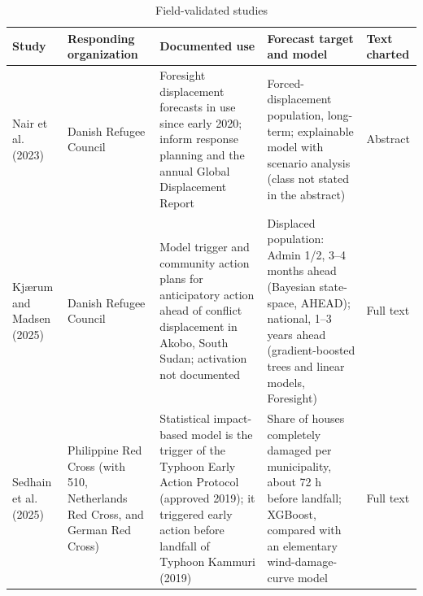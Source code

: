 \begin{table}[htbp!]
\centering
\scriptsize
\caption{Field-validated studies}
\label{tab:deployment_cases}
\begin{tabular}{@{}L{2.1cm}L{2.4cm}L{4.0cm}L{4.0cm}L{1.5cm}@{}}
\toprule
\textbf{Study} & \textbf{Responding organization} & \textbf{Documented use} & \textbf{Forecast target and model} & \textbf{Text charted} \\
\midrule
Nair et al. (2023) \cite{Nair2023ExplainableHumanitarianNeeds} & Danish Refugee Council & Foresight displacement forecasts in use since early 2020; inform response planning and the annual Global Displacement Report & Forced-displacement population, long-term; explainable model with scenario analysis (class not stated in the abstract) & Abstract \\[3pt]
Kj\ae{}rum and Madsen (2025) \cite{Kjaerum2025DisplacementAnticipatory} & Danish Refugee Council & Model trigger and community action plans for anticipatory action ahead of conflict displacement in Akobo, South Sudan; activation not documented & Displaced population: Admin 1/2, 3--4 months ahead (Bayesian state-space, AHEAD); national, 1--3 years ahead (gradient-boosted trees and linear models, Foresight) & Full text \\[3pt]
Sedhain et al. (2025) \cite{Sedhain2025ImpactBasedCycloneForecasting} & Philippine Red Cross (with 510, Netherlands Red Cross, and German Red Cross) & Statistical impact-based model is the trigger of the Typhoon Early Action Protocol (approved 2019); it triggered early action before landfall of Typhoon Kammuri (2019) & Share of houses completely damaged per municipality, about 72 h before landfall; XGBoost, compared with an elementary wind-damage-curve model & Full text \\[3pt]
\bottomrule
\end{tabular}
\end{table}
